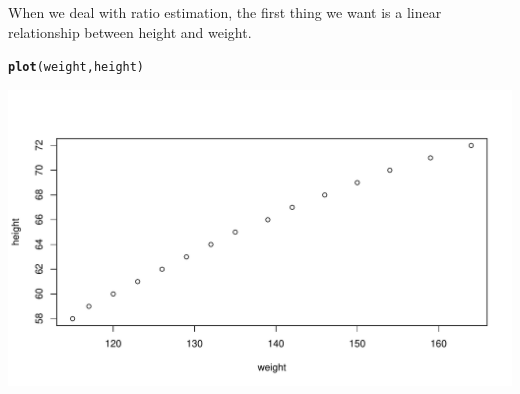 \documentclass[oneside]{book}\usepackage[]{graphicx}\usepackage[dvipsnames,table,xcdraw]{xcolor}
\makeatletter
\def\maxwidth{ %
  \ifdim\Gin@nat@width>\linewidth
    \linewidth
  \else
    \Gin@nat@width
  \fi
}
\newcommand{\hlstd}[1]{\textcolor[rgb]{0.345,0.345,0.345}{#1}}%
\newcommand{\hlkwd}[1]{\textcolor[rgb]{0.737,0.353,0.396}{\textbf{#1}}}%
\newenvironment{kframe}{%
 \def\at@end@of@kframe{}%
 \ifinner\ifhmode%
  \def\at@end@of@kframe{\end{minipage}}%
  \begin{minipage}{\columnwidth}%
 \fi\fi%
 \def\FrameCommand##1{\hskip\@totalleftmargin \hskip-\fboxsep
 \colorbox{shadecolor}{##1}\hskip-\fboxsep
     \hskip-\linewidth \hskip-\@totalleftmargin \hskip\columnwidth}%
 \MakeFramed {\advance\hsize-\width
   \@totalleftmargin\z@ \linewidth\hsize
   \@setminipage}}%
 {\par\unskip\endMakeFramed%
 \at@end@of@kframe}
\newenvironment{knitrout}{}{} %
\makeatother
\begin{document}
When we deal with ratio estimation, the first thing we want is a linear
relationship between height and weight.
\begin{knitrout}
\color{fgcolor}\begin{kframe}
\begin{alltt}
\hlkwd{plot}\hlstd{(weight, height)}
\end{alltt}
\end{kframe}

{\centering \includegraphics[width=\maxwidth]{figure/unnamed-chunk-45-1} 

}


\end{knitrout}
\end{document}
